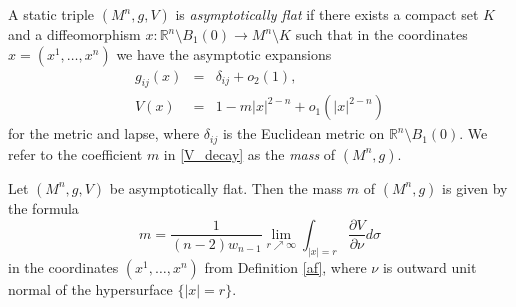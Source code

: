\documentclass[10pt,a4paper]{amsart}
\begin{document}
\begin{definition} \label{af}
A static triple $(M^{n},g,V)$ is \textit{asymptotically flat} if there exists a compact set $K$ and a diffeomorphism $x: \mathbb{R}^{n} \setminus B_{1}(0) \rightarrow M^{n} \setminus K$ such that in the coordinates $x=(x^{1},\dots,x^{n})$ we have the asymptotic expansions
\begin{eqnarray}
    g_{ij}(x) &=& \delta_{ij} + o_{2}(1), \label{g_decay} \\
    V(x) &=& 1 - m |x|^{2-n} + o_{1}(|x|^{2-n}) \label{V_decay}
\end{eqnarray}
for the metric and lapse, where $\delta_{ij}$ is the Euclidean metric on $\mathbb{R}^{n} \setminus B_{1}(0)$. We refer to the coefficient $m$ in \eqref{V_decay} as the \textit{mass} of $(M^{n},g)$.
\end{definition}

\begin{proposition} \label{mass_formula_theorem}
Let $(M^{n},g,V)$ be asymptotically flat. Then the mass $m$ of $(M^{n},g)$ is given by the formula
\begin{equation} \label{mass_formula}
     m = \frac{1}{(n-2)w_{n-1}} \lim_{r \nearrow \infty} \int_{|x| = r} \frac{\partial V}{\partial \nu} d\sigma
\end{equation}
in the coordinates $(x^{1},\dots,x^{n})$ from Definition \eqref{af}, where $\nu$ is outward unit normal of the hypersurface $\{ |x| = r \}$.
\end{proposition}
\end{document}

